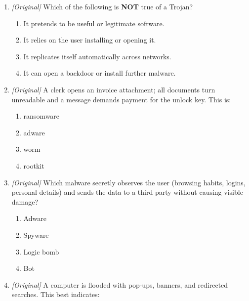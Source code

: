 \begin{enumerate}[label=\textbf{Q\arabic*.}, leftmargin=*]
\begin{enumerate}[label=\Alph*.]
    \item Virus --- needs a host file and a user action; worm --- standalone
      and self-spreading; Trojan --- disguised as legitimate, no
      self-replication
    \item Virus --- disguised as legitimate software; worm --- demands
      payment; Trojan --- records keystrokes
    \item Virus --- hides the attacker deep in the system; worm --- mines
      cryptocurrency; Trojan --- waits for a trigger date
  \end{enumerate}
\item \textit{[Original]} Which of the following is \textbf{NOT} true of a
  Trojan?
  \begin{enumerate}[label=\Alph*.]
    \item It pretends to be useful or legitimate software.
    \item It relies on the user installing or opening it.
    \item It replicates itself automatically across networks.
    \item It can open a backdoor or install further malware.
  \end{enumerate}
\item \textit{[Original]} A clerk opens an invoice attachment; all documents
  turn unreadable and a message demands payment for the unlock key. This is:
  \begin{enumerate}[label=\Alph*.]
    \item ransomware
    \item adware
    \item worm
    \item rootkit
  \end{enumerate}
\item \textit{[Original]} Which malware secretly observes the user (browsing
  habits, logins, personal details) and sends the data to a third party
  without causing visible damage?
  \begin{enumerate}[label=\Alph*.]
    \item Adware
    \item Spyware
    \item Logic bomb
    \item Bot
  \end{enumerate}
\item \textit{[Original]} A computer is flooded with pop-ups, banners, and
  redirected searches. This best indicates:
  \begin{enumerate}[label=\Alph*.]

\end{enumerate}
\end{enumerate}

